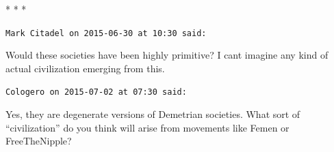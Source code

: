 
\begin{center}* * *\end{center}

\begin{footnotesize}
\begin{sffamily}
\texttt{Mark Citadel on 2015-06-30 at 10:30 said:}

Would these societies have been highly primitive? I cant imagine any kind of actual civilization emerging from this.

\hfill

\texttt{Cologero on 2015-07-02 at 07:30 said:}

Yes, they are degenerate versions of Demetrian societies. What sort of ``civilization'' do you think will arise from movements like Femen or FreeTheNipple?

\end{sffamily}
\end{footnotesize}

